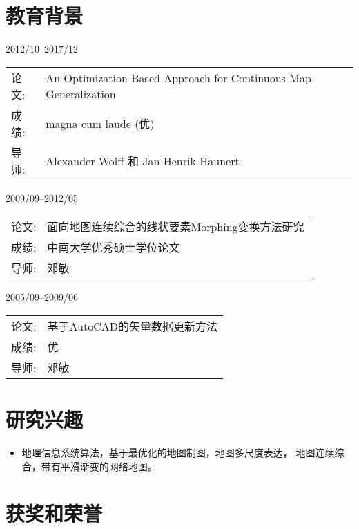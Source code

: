 \documentclass{resume}
\begin{document}
\section{教育背景}
{2012/10--2017/12}
\begin{tabular}{ll}			
	论文:  & An Optimization-Based Approach for Continuous Map Generalization\footnotemark\\
	成绩:      & magna cum laude (优)\\
	导师:      & Alexander Wolff 和 Jan-Henrik Haunert
\end{tabular}%
%
{2009/09--2012/05}
\begin{tabular}{ll}	
	论文:  & 面向地图连续综合的线状要素Morphing变换方法研究\footnotemark\\
	成绩:      & 中南大学优秀硕士学位论文\\
	导师:      & 邓敏
\end{tabular}
%
{2005/09--2009/06}
\begin{tabular}{ll}	
	论文:  & 基于AutoCAD的矢量数据更新方法\\
	成绩:      & 优\\
	导师:      & 邓敏
\end{tabular}



\section{研究兴趣}
\begin{itemize}[parsep=0ex]
\item 地理信息系统算法，基于最优化的地图制图，地图多尺度表达， 
    地图连续综合，带有平滑渐变的网络地图。
\end{itemize}

\section{获奖和荣誉}
\begin{itemize}[parsep=0ex]
\end{itemize}
\end{document}
